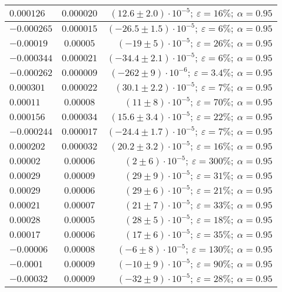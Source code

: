 \documentclass{article}%
\begin{document}
\begin{longtable}{| l | c | r |}
\hline%
$0.000126$&$0.000020$&$(12.6 \pm 2.0) \cdot 10 ^{-5};\:\varepsilon = 16\%; \: \alpha = 0.95$\\%
\hline%
$-0.000265$&$0.000015$&$(-26.5 \pm 1.5) \cdot 10 ^{-5};\:\varepsilon = 6\%; \: \alpha = 0.95$\\%
\hline%
$-0.00019$&$0.00005$&$(-19 \pm 5) \cdot 10 ^{-5};\:\varepsilon = 26\%; \: \alpha = 0.95$\\%
\hline%
$-0.000344$&$0.000021$&$(-34.4 \pm 2.1) \cdot 10 ^{-5};\:\varepsilon = 6\%; \: \alpha = 0.95$\\%
\hline%
$-0.000262$&$0.000009$&$(-262 \pm 9) \cdot 10 ^{-6};\:\varepsilon = 3.4\%; \: \alpha = 0.95$\\%
\hline%
$0.000301$&$0.000022$&$(30.1 \pm 2.2) \cdot 10 ^{-5};\:\varepsilon = 7\%; \: \alpha = 0.95$\\%
\hline%
$0.00011$&$0.00008$&$(11 \pm 8) \cdot 10 ^{-5};\:\varepsilon = 70\%; \: \alpha = 0.95$\\%
\hline%
$0.000156$&$0.000034$&$(15.6 \pm 3.4) \cdot 10 ^{-5};\:\varepsilon = 22\%; \: \alpha = 0.95$\\%
\hline%
$-0.000244$&$0.000017$&$(-24.4 \pm 1.7) \cdot 10 ^{-5};\:\varepsilon = 7\%; \: \alpha = 0.95$\\%
\hline%
$0.000202$&$0.000032$&$(20.2 \pm 3.2) \cdot 10 ^{-5};\:\varepsilon = 16\%; \: \alpha = 0.95$\\%
\hline%
$0.00002$&$0.00006$&$(2 \pm 6) \cdot 10 ^{-5};\:\varepsilon = 300\%; \: \alpha = 0.95$\\%
\hline%
$0.00029$&$0.00009$&$(29 \pm 9) \cdot 10 ^{-5};\:\varepsilon = 31\%; \: \alpha = 0.95$\\%
\hline%
$0.00029$&$0.00006$&$(29 \pm 6) \cdot 10 ^{-5};\:\varepsilon = 21\%; \: \alpha = 0.95$\\%
\hline%
$0.00021$&$0.00007$&$(21 \pm 7) \cdot 10 ^{-5};\:\varepsilon = 33\%; \: \alpha = 0.95$\\%
\hline%
$0.00028$&$0.00005$&$(28 \pm 5) \cdot 10 ^{-5};\:\varepsilon = 18\%; \: \alpha = 0.95$\\%
\hline%
$0.00017$&$0.00006$&$(17 \pm 6) \cdot 10 ^{-5};\:\varepsilon = 35\%; \: \alpha = 0.95$\\%
\hline%
$-0.00006$&$0.00008$&$(-6 \pm 8) \cdot 10 ^{-5};\:\varepsilon = 130\%; \: \alpha = 0.95$\\%
\hline%
$-0.0001$&$0.00009$&$(-10 \pm 9) \cdot 10 ^{-5};\:\varepsilon = 90\%; \: \alpha = 0.95$\\%
\hline%
$-0.00032$&$0.00009$&$(-32 \pm 9) \cdot 10 ^{-5};\:\varepsilon = 28\%; \: \alpha = 0.95$\\%

\end{longtable}
\end{document}
